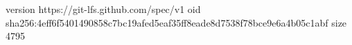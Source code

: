 version https://git-lfs.github.com/spec/v1
oid sha256:4eff6f5401490858c7bc19afed5eaf35ff8eade8d7538f78bce9e6a4b05c1abf
size 4795
